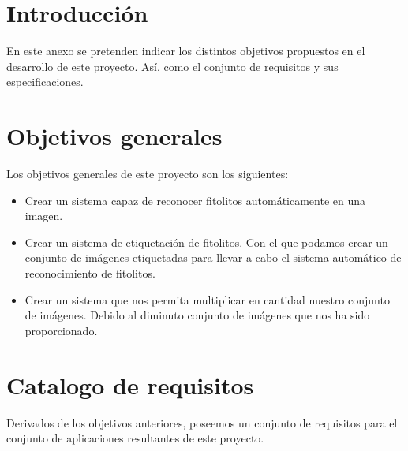 
\section{Introducción}
En este anexo se pretenden indicar los distintos objetivos propuestos en el desarrollo de este proyecto. Así, como el conjunto de requisitos y sus especificaciones.

\section{Objetivos generales}
Los objetivos generales de este proyecto son los siguientes:

\begin{itemize}
	\item Crear un sistema capaz de reconocer fitolitos automáticamente en una imagen.
	\item Crear un sistema de etiquetación de fitolitos. Con el que podamos crear un conjunto de imágenes etiquetadas para llevar a cabo el sistema automático de reconocimiento de fitolitos.
	\item Crear un sistema que nos permita multiplicar en cantidad nuestro conjunto de imágenes. Debido al diminuto conjunto de imágenes que nos ha sido proporcionado.
\end{itemize}

\section{Catalogo de requisitos}
Derivados de los objetivos anteriores, poseemos un conjunto de requisitos para el conjunto de aplicaciones resultantes de este proyecto.

